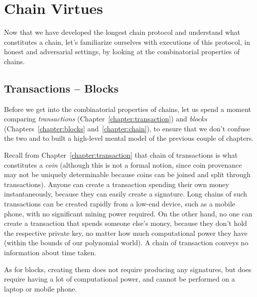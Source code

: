 \chapter{Chain Virtues}\label{chapter:virtues}

Now that we have developed the longest chain protocol and understand
what constitutes a chain, let's familiarize ourselves with executions
of this protocol, in honest and adversarial settings, by looking at
the combinatorial properties of chains.

\section{Transactions -- Blocks}

Before we get into the combinatorial properties of chains, let us spend a moment
comparing \emph{transactions} (Chapter~\ref{chapter:transaction}) and \emph{blocks}
(Chapters~\ref{chapter:blocks} and~\ref{chapter:chain}), to ensure
that we don't confuse the two and to built a high-level mental model of the
previous couple of chapters.

Recall from Chapter~\ref{chapter:transaction} that chain of transactions is what constitutes
a \emph{coin} (although this is not a formal notion, since coin provenance may not be uniquely
determinable because coins can be joined and split through transactions).
Anyone can create a transaction spending their own money instantaneously, because
they can easily create a signature. Long chains of such transactions can be created rapidly
from a low-end device, such as a mobile phone, with no significant mining power required.
On the other hand, no one can create a transaction that spends someone else's money,
because they don't hold the respective private key, no matter how much computational
power they have (within the bounds of our polynomial world). A chain of transaction
conveys no information about time taken.

As for blocks, creating them does not require producing any signatures, but does require
having a lot of computational power, and cannot be performed on a laptop or mobile phone.


